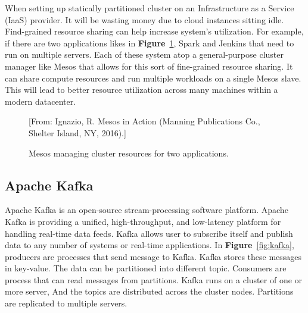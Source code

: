 \documentclass[12pt,oneside,openright,a4paper]{cpe-english-project}
\begin{document}
\hspace{10mm}When setting up statically partitioned cluster on an Infrastructure as a Service (IaaS) provider. It will be wasting money due to cloud instances sitting idle. Find-grained resource sharing can help increase system’s utilization. For example, if there are two applications likes in \textbf{Figure}~\ref{fig:spark}, Spark and Jenkins that need to run on multiple servers. Each of these system atop a general-purpose cluster manager like Mesos that allows for this sort of fine-grained resource sharing. It can share compute resources and run multiple workloads on a single Mesos slave. This will lead to better resource utilization across many machines within a modern datacenter.\cite{mesosInAction}

\begin{figure}[!h]\centering
  \setlength{\fboxrule}{0mm} %
  \setlength{\fboxsep}{0cm}
  \caption{Mesos managing cluster resources for two applications.}\label{fig:spark}
  [From: Ignazio, R. Mesos in Action (Manning Publications Co., Shelter Island, NY, 2016).]
\end{figure}

\subsection{Apache Kafka}

\hspace{10mm}Apache Kafka is an open-source stream-processing software platform. Apache Kafka is providing a unified, high-throughput, and low-latency platform for handling real-time data feeds. Kafka allows user to subscribe itself and publish data to any number of systems or real-time applications. In \textbf{Figure}~\ref{fig:kafka}, producers are processes that send message to Kafka. Kafka stores these messages in key-value. The data can be partitioned into different topic. Consumers are process that can read messages from partitions. Kafka runs on a cluster of one or more server, And the topics are distributed across the cluster nodes. Partitions are replicated to multiple servers.\cite{kafka}
\end{document}
